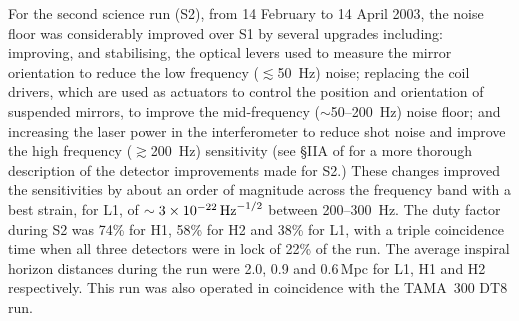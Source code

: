 \documentclass{article}
\begin{document}

For the second science run (S2), from 14 February to 14 April 2003, the noise
floor was considerably improved over S1 by several upgrades including:
improving, and stabilising, the optical levers used to measure the mirror
orientation to reduce the low frequency ($\lesssim$50~Hz) noise; replacing the
coil drivers, which are used as actuators to control the position and orientation
of suspended mirrors, to improve the mid-frequency ($\sim$50--200~Hz) noise
floor; and increasing the laser power in the interferometer to reduce shot noise
and improve the high frequency ($\gtrsim$200~Hz) sensitivity (see \S{}IIA of
\cite{Abbott:2005a} for a more thorough description of the detector
improvements made for S2.) These changes improved the sensitivities by about an order of
magnitude across the frequency band with a best strain, for L1, of
$\sim3\times10^{-22}\,{\rm Hz}^{-1/2}$ between 200--300~Hz. The duty factor
during S2 was 74\% for H1, 58\% for H2 and 38\% for L1, with a triple
coincidence time when all three detectors were in lock of 22\% of the run.
The average inspiral horizon distances during the run were 2.0, 0.9 and
0.6\,Mpc for L1, H1 and H2 respectively. This run was also operated in
coincidence with the TAMA~300 DT8 run.
\end{document}
